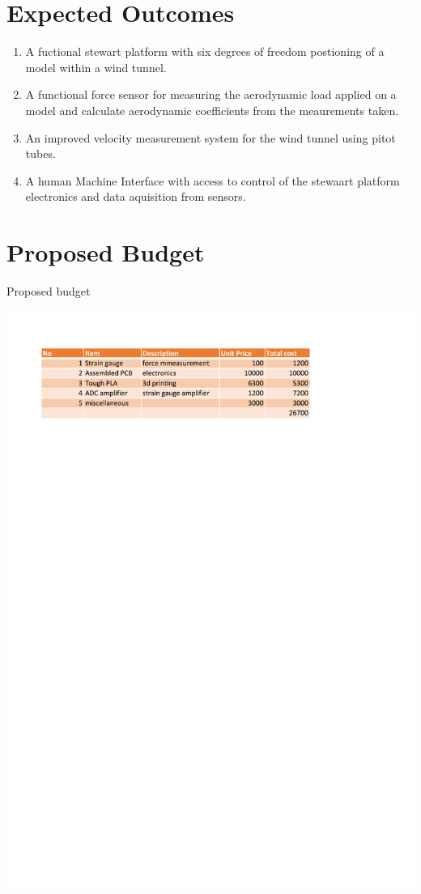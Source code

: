 \section{Expected Outcomes}
\begin{enumerate}
\item A fuctional stewart platform with six degrees of freedom postioning of a model within a wind tunnel.
\item A functional force sensor for measuring the aerodynamic load applied on a model and calculate aerodynamic coefficients from the meaurements taken.
\item An improved velocity measurement system for the wind tunnel using pitot tubes.
\item A human Machine Interface with access to control  of the stewaart platform electronics and data aquisition from sensors.
\end{enumerate}
\newpage
\section{Proposed Budget}
\begin{center}
\begin{table}[!h]
\centering
\caption{Proposed budget}
\includegraphics{Figures/budget}
\end{table}
\end{center}
